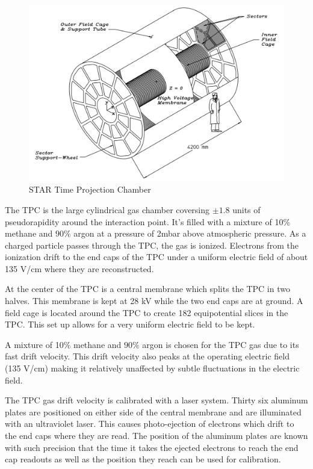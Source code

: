 \documentclass[abstract = on,listof=totoc, bibliography=totoc]{scrreprt}
\begin{document}
\begin{figure}
\begin{center}
\includegraphics[width = 1\textwidth]{tpcSchem}
\caption[STAR Time Projection Chamber]{STAR Time Projection Chamber}
\label{fig:tpcSchem}
\end{center}
\end{figure}


The TPC is the large cylindrical gas chamber coversing $\pm1.8$ units of pseudorapidity around the interaction point. It's filled with a mixture of 10$\%$ methane and $90\%$ argon at a pressure of 2mbar above atmospheric pressure. As a charged particle passes through the TPC, the gas is ionized. Electrons from the ionization drift to the end caps of the TPC under a uniform electric field of about 135 V/cm where they are reconstructed.

At the center of the TPC is a central membrane which splits the TPC in two halves. This membrane is kept at 28 kV while the two end caps are at ground. A field cage is located around the TPC to create 182 equipotential slices in the TPC. This set up allows for a very uniform electric field to be kept.   

A mixture of 10$\%$ methane and $90\%$ argon is chosen for the TPC gas due to its fast drift velocity. This drift velocity also peaks at the operating electric field (135 V/cm) making it relatively unaffected by subtle fluctuations in the electric field.

The TPC gas drift velocity is calibrated with a laser system. Thirty six aluminum plates are positioned on either side of the central membrane and are illuminated with an ultraviolet laser. This causes photo-ejection of electrons which drift to the end caps where they are read. The position of the aluminum plates are known with such precision that the time it takes the ejected electrons to reach the end cap readouts as well as the position they reach can be used for calibration. 
\end{document}
